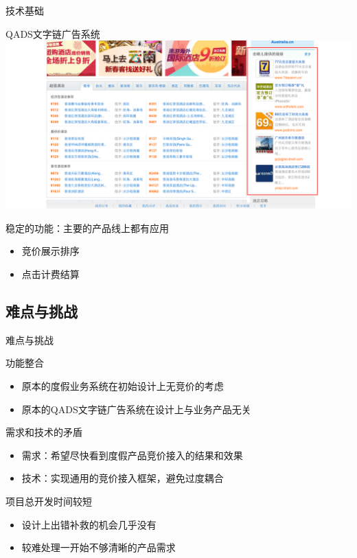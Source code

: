 \documentclass{beamer}
\begin{document}
\begin{CJK}{UTF8}{gbsn}
\begin{frame}{技术基础}
\begin{block}{QADS文字链广告系统}
  \includegraphics[scale=0.23]{./imgs/qads-demo}
  \pause
\end{block}
\begin{block}{稳定的功能：主要的产品线上都有应用}
  \begin{itemize}
    \item {
      竞价展示排序 
    }
    \item {
      点击计费结算 
    }
  \end{itemize}
\end{block}
\end{frame}

\subsection{难点与挑战}

\begin{frame}{难点与挑战}
  \begin{block}{功能整合}
    \begin{itemize}
      \item {
        原本的度假业务系统在初始设计上无竞价的考虑
      }
      \item {
        原本的QADS文字链广告系统在设计上与业务产品无关
      }
    \end{itemize}
    \pause
  \end{block}
  \begin{block}{需求和技术的矛盾}
    \begin{itemize}
    \item {
      需求：希望尽快看到度假产品竞价接入的结果和效果
    }
    \item {
      技术：实现通用的竞价接入框架，避免过度耦合
    }
    \end{itemize}
    \pause
  \end{block}
  \begin{block}{项目总开发时间较短}
    \begin{itemize}
      \item {
        设计上出错补救的机会几乎没有
      }
      \item {
        较难处理一开始不够清晰的产品需求
      }
    \end{itemize}
  \end{block}
\end{frame}


\end{CJK}
\end{document}
